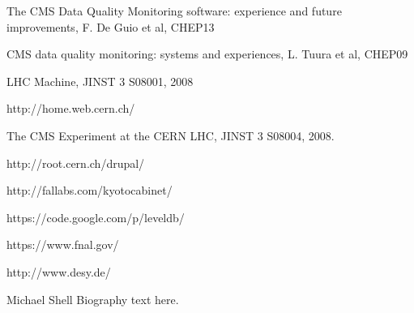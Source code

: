 \documentclass[journal]{IEEEtran}
\begin{document}

%
%
%
\begin{thebibliography}{1}
The CMS Data Quality Monitoring software: experience and future improvements, F. De Guio et al, CHEP13

CMS data quality monitoring: systems and experiences, L. Tuura et al, CHEP09

LHC Machine, JINST 3 S08001, 2008

http://home.web.cern.ch/

The CMS Experiment at the CERN LHC, JINST 3 S08004, 2008.

http://root.cern.ch/drupal/

http://fallabs.com/kyotocabinet/

https://code.google.com/p/leveldb/

https://www.fnal.gov/

http://www.desy.de/

\end{thebibliography}

% 

\begin{IEEEbiography}{Michael Shell}
Biography text here.
\end{IEEEbiography}
\end{document}
